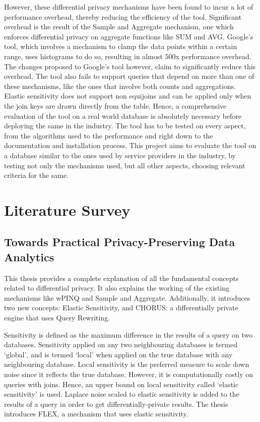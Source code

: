 \documentclass[acmsmall]{acmart}
\begin{document}
However, these differential privacy mechanisms have been found to incur a lot of performance overhead, thereby reducing the efficiency of the tool. Significant overhead is the result of the Sample and Aggregate mechanism, one which enforces differential privacy on aggregate functions like SUM and AVG. Google’s tool, which involves a mechanism to clamp the data points within a certain range, uses histograms to do so, resulting in almost 500x performance overhead. The changes proposed to Google’s tool however, claim to significantly reduce this overhead. The tool also fails to support queries that depend on more than one of these mechanisms, like the ones that involve both counts and aggregations. Elastic sensitivity does not support non equijoins and can be applied only when the join keys are drawn directly from the table.
\newline
Hence, a comprehensive evaluation of the tool on a real world database is absolutely necessary before deploying the same in the industry. The tool has to be tested on every aspect, from the algorithms used to the performance and right down to the documentation and installation process. This project aims to evaluate the tool on a database similar to the ones used by service providers in the industry, by testing not only the mechanisms used, but all other aspects, choosing relevant criteria for the same.


\section{Literature Survey}\label{2}
\subsection{Towards Practical Privacy-Preserving Data Analytics}\label{2.1}
This thesis\cite{Johnson2018TowardsPDP} provides a complete explanation of all the fundamental concepts related to differential privacy. It also explains the working of the existing mechanisms like wPINQ and Sample and Aggregate. Additionally, it introduces two new concepts: Elastic Sensitivity, and CHORUS: a differentially private engine that uses Query Rewriting. 

Sensitivity is defined as the maximum difference in the results of a query on two databases. Sensitivity applied on any two neighbouring databases is termed ‘global’, and is termed ‘local’ when applied on the true database with any neighbouring database.
Local sensitivity is the preferred measure to scale down noise since it reflects the true database. However, it is computationally costly on queries with joins. Hence, an upper bound on local sensitivity called ‘elastic sensitivity’ is used.
Laplace noise scaled to elastic sensitivity is added to the results of a query in order to get differentially-private results. The thesis introduces FLEX, a mechanism that uses elastic sensitivity. 
\end{document}
